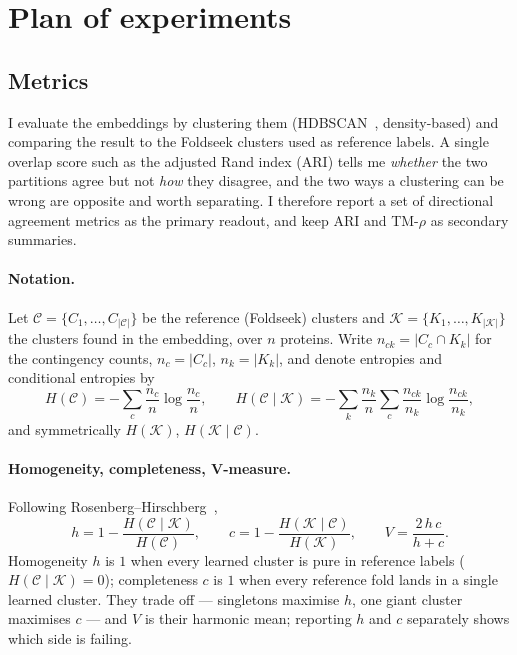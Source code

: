 \documentclass[11pt,a4paper]{article}
\theoremstyle{definition}
\begin{document}
\section{Plan of experiments}
\label{sec:plan}

\subsection{Metrics}

I evaluate the embeddings by clustering them (HDBSCAN~\cite{hdbscan}, density-based)
and comparing the result to the Foldseek clusters used as reference labels. A
single overlap score such as the adjusted Rand index (ARI) tells me \emph{whether}
the two partitions agree but not \emph{how} they disagree, and the two ways a
clustering can be wrong are opposite and worth separating. I therefore report a
set of directional agreement metrics as the primary readout, and keep ARI and
TM-$\rho$ as secondary summaries.

\paragraph{Notation.} Let $\mathcal{C}=\{C_1,\dots,C_{|\mathcal{C}|}\}$ be the
reference (Foldseek) clusters and $\mathcal{K}=\{K_1,\dots,K_{|\mathcal{K}|}\}$ the
clusters found in the embedding, over $n$ proteins. Write $n_{ck}=|C_c\cap K_k|$ for
the contingency counts, $n_c=|C_c|$, $n_k=|K_k|$, and denote entropies and
conditional entropies by
\[
H(\mathcal{C})=-\sum_c\frac{n_c}{n}\log\frac{n_c}{n},\qquad
H(\mathcal{C}\mid\mathcal{K})=-\sum_k\frac{n_k}{n}\sum_c\frac{n_{ck}}{n_k}\log\frac{n_{ck}}{n_k},
\]
and symmetrically $H(\mathcal{K})$, $H(\mathcal{K}\mid\mathcal{C})$.

\paragraph{Homogeneity, completeness, V-measure.} Following
Rosenberg--Hirschberg~\cite{rosenberg2007},
\[
h=1-\frac{H(\mathcal{C}\mid\mathcal{K})}{H(\mathcal{C})},\qquad
c=1-\frac{H(\mathcal{K}\mid\mathcal{C})}{H(\mathcal{K})},\qquad
V=\frac{2\,h\,c}{h+c}.
\]
Homogeneity $h$ is $1$ when every learned cluster is pure in reference labels
($H(\mathcal{C}\mid\mathcal{K})=0$); completeness $c$ is $1$ when every reference
fold lands in a single learned cluster. They trade off — singletons maximise $h$,
one giant cluster maximises $c$ — and $V$ is their harmonic mean; reporting $h$ and
$c$ separately shows which side is failing.
\end{document}
